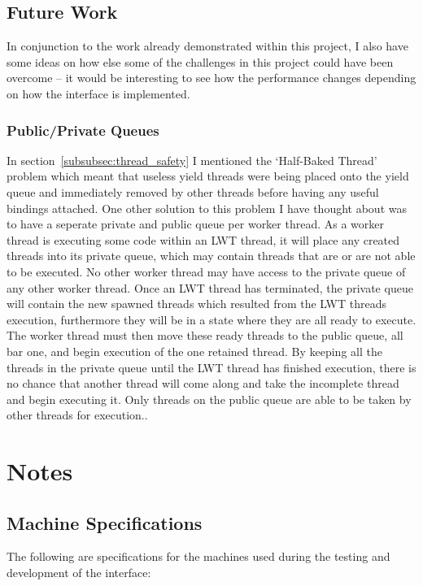 \documentclass[12pt,twoside,notitlepage]{report}
\begin{document}
\section{Future Work}
In conjunction to the work already demonstrated within this project, I also have some ideas on how else some of the challenges in this project could have been overcome -- it would be interesting to see how the performance changes
depending on how the interface is implemented.

\subsection{Public/Private Queues}
In section~\ref{subsubsec:thread_safety} I mentioned the `Half-Baked Thread' problem which meant that useless yield threads were being placed onto the yield queue and immediately removed by other threads before having any useful
bindings attached. One other solution to this problem I have thought about was to have a seperate private and public queue per worker thread. As a worker thread is executing some code within an LWT thread, it will place any created
threads into its private queue, which may contain threads that are or are not able to be executed. No other worker thread may have access to the private queue of any other worker thread. Once an LWT thread has terminated, the private
queue will contain the new spawned threads which resulted from the LWT threads execution, furthermore they will be in a state where they are all ready to execute. The worker thread must then move these ready threads to the public
queue, all bar one, and begin execution of the one retained thread. By keeping all the threads in the private queue until the LWT thread has finished execution, there is no chance that another thread will come along and take the
incomplete thread and begin executing it. Only threads on the public queue are able to be taken by other threads for execution..



\appendix
\chapter{Notes}
\section{Machine Specifications}
The following are specifications for the machines used during the testing and development of the interface:
\end{document}
